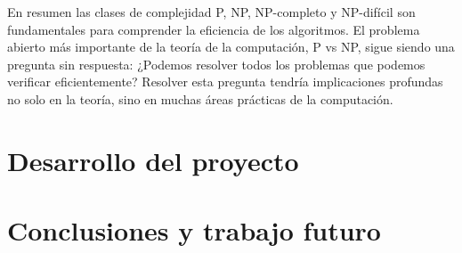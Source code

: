 \documentclass[12pt,titlepage,twoside,openright]{book}
\begin{document}
En resumen las clases de complejidad P, NP, NP-completo y NP-dif\'icil son fundamentales para comprender la eficiencia de los algoritmos. El problema abierto m\'as importante de la teor\'ia de la computaci\'on, P vs NP, sigue siendo una pregunta sin respuesta: ¿Podemos resolver todos los problemas que podemos verificar eficientemente? Resolver esta pregunta tendr\'ia implicaciones profundas no solo en la teor\'ia, sino en muchas \'areas pr\'acticas de la computaci\'on.

\chapter{Desarrollo del proyecto}

\chapter{Conclusiones y trabajo futuro}



\begin{thebibliography}{0}

\end{thebibliography}
\end{document}
